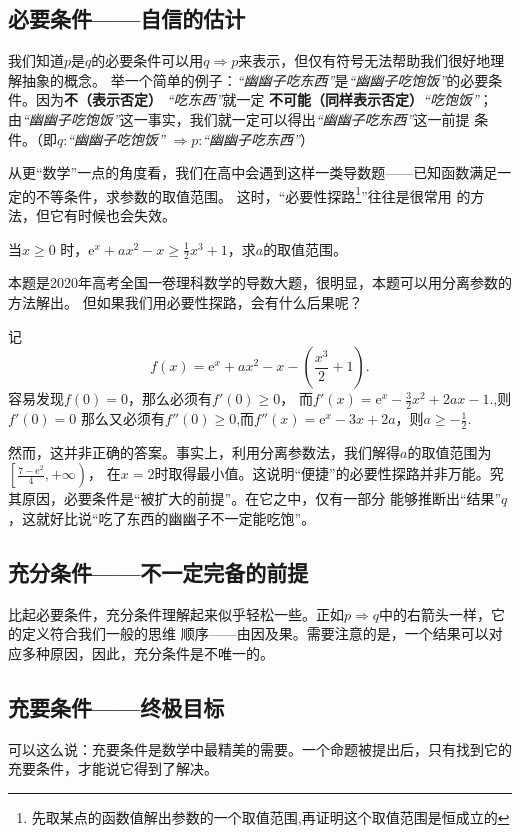 \subsection{必要条件——自信的估计}
我们知道$p$是$q$的必要条件可以用$q \Rightarrow {p}$来表示，但仅有符号无法帮助我们很好地理解抽象的概念。
举一个简单的例子：\textit{“幽幽子吃东西”}是\textit{“幽幽子吃饱饭”}的必要条件。因为\textbf{不（表示否定） }\textit{“吃东西”}就一定%
\textbf{不可能（同样表示否定）}\textit{“吃饱饭”}；由\textit{“幽幽子吃饱饭”}这一事实，我们就一定可以得出\textit{“幽幽子吃东西”}这一前提
条件。（即$q$:\textit{“幽幽子吃饱饭”} $\Rightarrow p$:\textit{“幽幽子吃东西”}）


从更“数学”一点的角度看，我们在高中会遇到这样一类导数题——已知函数满足一定的不等条件，求参数的取值范围。
这时，“必要性探路\footnote{先取某点的函数值解出参数的一个取值范围,再证明这个取值范围是恒成立的}”往往是很常用
的方法，但它有时候也会失效。
\begin{example}
    当$x \geqslant 0$ 时，$\mathrm{e}^x+ax^2 -x \geqslant \frac{1}{2}x^3 +1$，求$a$的取值范围。
\end{example}
\begin{solve}
    本题是2020年高考全国一卷理科数学的导数大题，很明显，本题可以用分离参数的方法解出。
    但如果我们用必要性探路，会有什么后果呢？

    记
    \[
        f(x)=\mathrm{e}^x+ax^2 -x-\left (\frac{x^3}{2} +1\right )
        .\]
    容易发现$f(0)=0$，那么必须有$f'(0)\geqslant 0$，
    而$f'(x)=\mathrm e^x-\frac{3}{2}x^2+2ax-1.$,则
    $f'(0)=0$ 那么又必须有$f''(0)\geqslant 0$,而$f''(x)=\mathrm e^x-3x+2a$，则$a\geqslant -\frac{1}{2}$.

\end{solve}

然而，这并非正确的答案。事实上，利用分离参数法，我们解得$a$的取值范围为$\left [ \frac{7-\mathrm e^2}{4},+\infty  \right ) $，
在$x=2$时取得最小值。这说明“便捷”的必要性探路并非万能。究其原因，必要条件是“被扩大的前提”。在它之中，仅有一部分
能够推断出“结果”$q$，这就好比说“吃了东西的幽幽子不一定能吃饱”。

\subsection{充分条件——不一定完备的前提}
比起必要条件，充分条件理解起来似乎轻松一些。正如$p\Rightarrow q$中的右箭头一样，它的定义符合我们一般的思维
顺序——由因及果。需要注意的是，一个结果可以对应多种原因，因此，充分条件是不唯一的。

\subsection{充要条件——终极目标}
可以这么说：充要条件是数学中最精美的需要。一个命题被提出后，只有找到它的充要条件，才能说它得到了解决。


